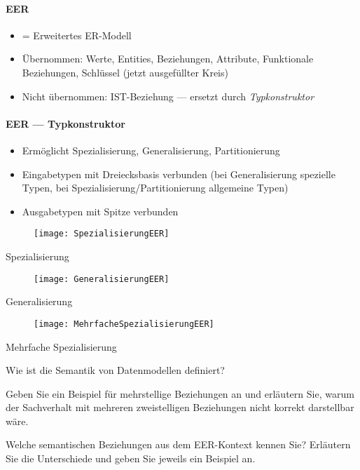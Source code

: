 \paragraph{EER}
\begin{itemize}
	\item = Erweitertes ER-Modell
	\item Übernommen: Werte, Entities, Beziehungen, Attribute, Funktionale Beziehungen, Schlüssel (jetzt ausgefüllter Kreis)
	\item Nicht übernommen: IST-Beziehung --- ersetzt durch \emph{Typkonstruktor}
\end{itemize}

\paragraph{EER --- Typkonstruktor}
\begin{itemize}
	\item Ermöglicht Spezialisierung, Generalisierung, Partitionierung
	\item Eingabetypen mit Dreiecksbasis verbunden (bei Generalisierung spezielle Typen, bei Spezialisierung/Partitionierung allgemeine Typen)
	\item Ausgabetypen mit Spitze verbunden
\end{itemize}
\begin{center}
	\begin{figure}[H]\centering\label{SpezialisierungEER}\texttt{[image: SpezialisierungEER]}\end{figure}
	Spezialisierung
	\begin{figure}[H]\centering\label{GeneralisierungEER}\texttt{[image: GeneralisierungEER]}\end{figure}
	Generalisierung
	\begin{figure}[H]\centering\label{MehrfacheSpezialisierungEER}\texttt{[image: MehrfacheSpezialisierungEER]}\end{figure}
	Mehrfache Spezialisierung
\end{center}

\begin{fragen}
	\item Wie ist die Semantik von Datenmodellen definiert?
	\item Geben Sie ein Beispiel für mehrstellige Beziehungen an und erläutern Sie, warum der Sachverhalt mit mehreren zweistelligen Beziehungen nicht korrekt darstellbar wäre.
	\item Welche semantischen Beziehungen aus dem EER-Kontext kennen Sie? Erläutern Sie die Unterschiede und geben Sie jeweils ein Beispiel an.
\end{fragen}
